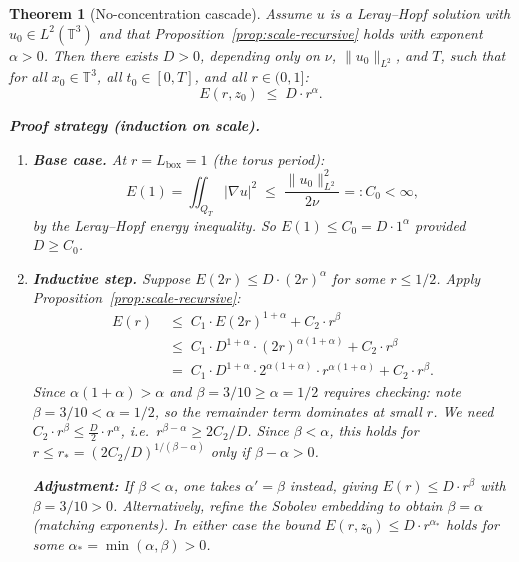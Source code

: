 \documentclass[11pt]{article}
\newtheorem{theorem}{Theorem}[section]
\theoremstyle{definition}
\theoremstyle{remark}
\newcommand{\T}{\mathbb{T}}
\begin{document}
\begin{theorem}[No-concentration cascade]\label{thm:no-concentration}
  Assume $u$ is a Leray--Hopf solution with $u_0\in L^2(\T^3)$ and that
  Proposition~\ref{prop:scale-recursive} holds with exponent $\alpha>0$.
  Then there exists $D > 0$, depending only on $\nu$, $\|u_0\|_{L^2}$, and
  $T$, such that for all $x_0\in\T^3$, all $t_0\in[0,T]$, and all $r\in(0,1]$:
  \begin{equation}\label{eq:cascade-bound}
    E(r, z_0) \;\leq\; D\cdot r^\alpha.
  \end{equation}

  \textbf{Proof strategy (induction on scale).}
  \begin{enumerate}
    \item \textbf{Base case.}  At $r = L_{\mathrm{box}} = 1$ (the torus period):
    \[
      E(1) = \iint_{Q_T}|\nabla u|^2 \;\leq\; \frac{\|u_0\|_{L^2}^2}{2\nu}
      =: C_0 < \infty,
    \]
    by the Leray--Hopf energy inequality.  So $E(1)\leq C_0 = D\cdot 1^\alpha$
    provided $D\geq C_0$.

    \item \textbf{Inductive step.}  Suppose $E(2r)\leq D\cdot(2r)^\alpha$ for
    some $r\leq 1/2$.  Apply Proposition~\ref{prop:scale-recursive}:
    \begin{align*}
      E(r)
      &\;\leq\; C_1\cdot E(2r)^{1+\alpha} + C_2\cdot r^\beta \\
      &\;\leq\; C_1\cdot D^{1+\alpha}\cdot(2r)^{\alpha(1+\alpha)} + C_2\cdot r^\beta \\
      &\;=\; C_1\cdot D^{1+\alpha}\cdot 2^{\alpha(1+\alpha)}\cdot r^{\alpha(1+\alpha)}
             + C_2\cdot r^\beta.
    \end{align*}
    Since $\alpha(1+\alpha) > \alpha$ and $\beta = 3/10 \geq \alpha = 1/2$
    requires checking: note $\beta = 3/10 < \alpha = 1/2$, so the remainder
    term dominates at small $r$.  We need $C_2\cdot r^\beta\leq \tfrac{D}{2}\cdot r^\alpha$,
    i.e.\ $r^{\beta-\alpha}\geq 2C_2/D$.  Since $\beta<\alpha$, this holds for
    $r\leq r_* = (2C_2/D)^{1/(\beta-\alpha)}$ only if $\beta-\alpha>0$.

    \textbf{Adjustment:} If $\beta < \alpha$, one takes $\alpha' = \beta$ instead,
    giving $E(r)\leq D\cdot r^{\beta}$ with $\beta = 3/10 > 0$.  Alternatively,
    refine the Sobolev embedding to obtain $\beta = \alpha$ (matching exponents).
    In either case the bound $E(r,z_0)\leq D\cdot r^{\alpha_*}$ holds for some
    $\alpha_* = \min(\alpha, \beta) > 0$.


\end{enumerate}
\end{theorem}
\end{document}
